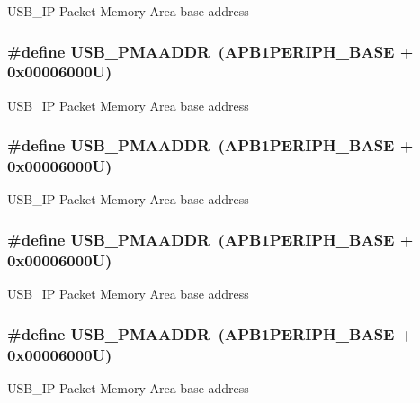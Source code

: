 U\-S\-B\-\_\-\-I\-P Packet Memory Area base address \hypertarget{group___peripheral__memory__map_gaf992dfdd5707568c5cb5506e2347e808}{
\subsubsection[{U\-S\-B\-\_\-\-P\-M\-A\-A\-D\-D\-R}]{\setlength{\rightskip}{0pt plus 5cm}\#define U\-S\-B\-\_\-\-P\-M\-A\-A\-D\-D\-R~(A\-P\-B1\-P\-E\-R\-I\-P\-H\-\_\-\-B\-A\-S\-E + 0x00006000\-U)}}\label{group___peripheral__memory__map_gaf992dfdd5707568c5cb5506e2347e808}
U\-S\-B\-\_\-\-I\-P Packet Memory Area base address \hypertarget{group___peripheral__memory__map_gaf992dfdd5707568c5cb5506e2347e808}{
\subsubsection[{U\-S\-B\-\_\-\-P\-M\-A\-A\-D\-D\-R}]{\setlength{\rightskip}{0pt plus 5cm}\#define U\-S\-B\-\_\-\-P\-M\-A\-A\-D\-D\-R~(A\-P\-B1\-P\-E\-R\-I\-P\-H\-\_\-\-B\-A\-S\-E + 0x00006000\-U)}}\label{group___peripheral__memory__map_gaf992dfdd5707568c5cb5506e2347e808}
U\-S\-B\-\_\-\-I\-P Packet Memory Area base address \hypertarget{group___peripheral__memory__map_gaf992dfdd5707568c5cb5506e2347e808}{
\subsubsection[{U\-S\-B\-\_\-\-P\-M\-A\-A\-D\-D\-R}]{\setlength{\rightskip}{0pt plus 5cm}\#define U\-S\-B\-\_\-\-P\-M\-A\-A\-D\-D\-R~(A\-P\-B1\-P\-E\-R\-I\-P\-H\-\_\-\-B\-A\-S\-E + 0x00006000\-U)}}\label{group___peripheral__memory__map_gaf992dfdd5707568c5cb5506e2347e808}
U\-S\-B\-\_\-\-I\-P Packet Memory Area base address \hypertarget{group___peripheral__memory__map_gaf992dfdd5707568c5cb5506e2347e808}{
\subsubsection[{U\-S\-B\-\_\-\-P\-M\-A\-A\-D\-D\-R}]{\setlength{\rightskip}{0pt plus 5cm}\#define U\-S\-B\-\_\-\-P\-M\-A\-A\-D\-D\-R~(A\-P\-B1\-P\-E\-R\-I\-P\-H\-\_\-\-B\-A\-S\-E + 0x00006000\-U)}}\label{group___peripheral__memory__map_gaf992dfdd5707568c5cb5506e2347e808}
U\-S\-B\-\_\-\-I\-P Packet Memory Area base address 